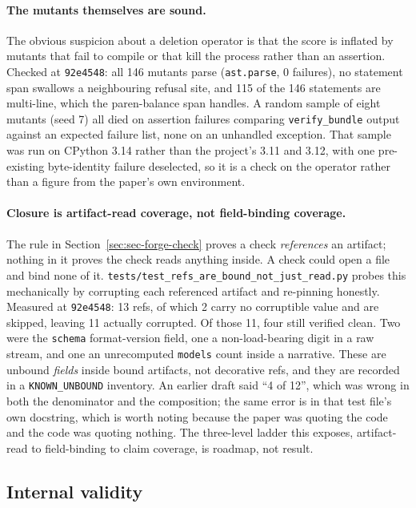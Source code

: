 \documentclass[11pt]{article}
\begin{document}
\paragraph{The mutants themselves are sound.} The obvious suspicion about a deletion operator
is that the score is inflated by mutants that fail to compile or that kill the process rather
than an assertion. Checked at \texttt{92e4548}: all 146 mutants parse (\texttt{ast.parse}, 0
failures), no statement span swallows a neighbouring refusal site, and 115 of the 146 statements
are multi-line, which the paren-balance span handles. A random sample of eight mutants
(seed 7) all died on assertion failures comparing \texttt{verify\_bundle} output against an
expected failure list, none on an unhandled exception. That sample was run on CPython 3.14
rather than the project's 3.11 and 3.12, with one pre-existing byte-identity failure
deselected, so it is a check on the operator rather than a figure from the paper's own
environment.

\paragraph{Closure is artifact-read coverage, not field-binding coverage.} The rule in
Section~\ref{sec:sec-forge-check} proves a check \emph{references} an artifact; nothing in it
proves the check reads anything inside. A check could open a file and bind none of it.
\texttt{tests/test\_refs\_are\_bound\_not\_just\_read.py} probes this mechanically by
corrupting each referenced artifact and re-pinning honestly. Measured at \texttt{92e4548}:
13 refs, of which 2 carry no corruptible value and are skipped, leaving 11 actually corrupted.
Of those 11, four still verified clean. Two were the \texttt{schema} format-version field, one
a non-load-bearing digit in a raw stream, and one an unrecomputed \texttt{models} count inside
a narrative. These are unbound \emph{fields} inside bound artifacts, not decorative refs, and
they are recorded in a \texttt{KNOWN\_UNBOUND} inventory. An earlier draft said ``4 of 12'',
which was wrong in both the denominator and the composition; the same error is in that test
file's own docstring, which is worth noting because the paper was quoting the code and the code
was quoting nothing. The three-level ladder this exposes, artifact-read to field-binding to
claim coverage, is roadmap, not result.

\subsection{Internal validity}
\end{document}
